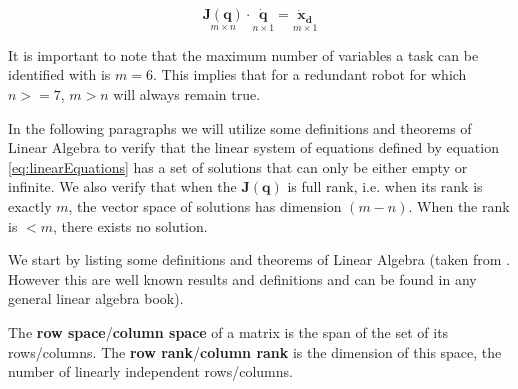 \begin{equation}
    \label{eq:linearEquations}
    \underset{m\times n}{\mathbf{J}(\mathbf{{q}})} \cdot  \underset{n\times 1}{\mathbf{\dot{q}}} = \underset{m\times 1}{\mathbf{\dot{x}_{d}}}
\end{equation}

It is important to note that the maximum number of variables a task can be identified with is $m = 6$. This implies that for a redundant robot for which $n >= 7$, $m > n$ will always remain true.

In the following paragraphs we will utilize some definitions and theorems of Linear Algebra to verify that the linear system of equations defined by equation \ref{eq:linearEquations} has a set of solutions that can only be either empty or infinite. We also verify that when the ${\mathbf{J}(\mathbf{{q}})}$ is full rank, i.e. when its rank is exactly $m$, the vector space of solutions has dimension $(m-n)$. When the rank is $<m$, there exists no solution.

We start by listing some definitions and theorems of Linear Algebra (taken from \cite{hefferonlinear}. However this are well known results and definitions and can be found in any general linear algebra book).



\begin{definition}
The \textbf{row space}/\textbf{column space} of a matrix is the span of the set of its rows/columns. The \textbf{row rank}/\textbf{column rank} is the dimension of this space, the number of linearly independent rows/columns.
\end{definition}

